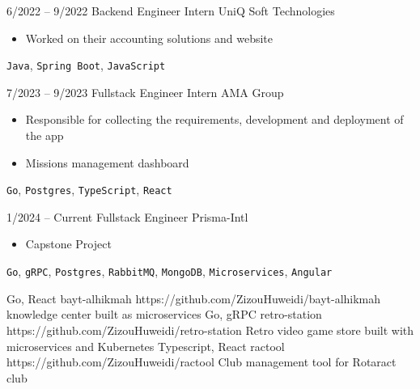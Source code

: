 \documentclass[9pt]{developercv} %
\begin{document}
\vspace{-10 pt}
\begin{entrylist}
	\entry
	{6/2022 -- 9/2022}
	{Backend Engineer Intern}
	{UniQ Soft Technologies}
	{\vspace{-10pt}
		\begin{itemize}[noitemsep,topsep=0pt,parsep=0pt,partopsep=0pt, leftmargin=-1pt]
			\item Worked on their accounting solutions and website
		\end{itemize}
		\texttt{Java}, \texttt{Spring Boot}, \texttt{JavaScript}}
	\entry
	{7/2023 -- 9/2023}
	{Fullstack Engineer Intern}
	{AMA Group}
	{\vspace{-10pt}
		\begin{itemize}[noitemsep,topsep=0pt,parsep=0pt,partopsep=0pt, leftmargin=-1pt]
			\item Responsible for collecting the requirements, development and deployment of the app
			\item Missions management dashboard
		\end{itemize}
		\texttt{Go}, \texttt{Postgres}, \texttt{TypeScript}, \texttt{React}}
	\entry
	{1/2024 -- Current}
	{Fullstack Engineer}
	{Prisma-Intl}
	{\vspace{-10pt}
		\begin{itemize}[noitemsep,topsep=0pt,parsep=0pt,partopsep=0pt, leftmargin=-1pt]
			\item Capstone Project
		\end{itemize}
		\texttt{Go}, \texttt{gRPC}, \texttt{Postgres}, \texttt{RabbitMQ}, \texttt{MongoDB}, \texttt{Microservices}, \texttt{Angular}}
\end{entrylist}

\begin{entrylist}
	\entry
	{Go, React}
	{bayt-alhikmah}
	{https://github.com/ZizouHuweidi/bayt-alhikmah}
	{knowledge center built as microservices}
	\entry
	{Go, gRPC}
	{retro-station}
	{https://github.com/ZizouHuweidi/retro-station}
	{Retro video game store built with microservices and Kubernetes}
	\entry
	{Typescript, React}
	{ractool}
	{https://github.com/ZizouHuweidi/ractool}
	{Club management tool for Rotaract club}
\end{entrylist}
\end{document}
